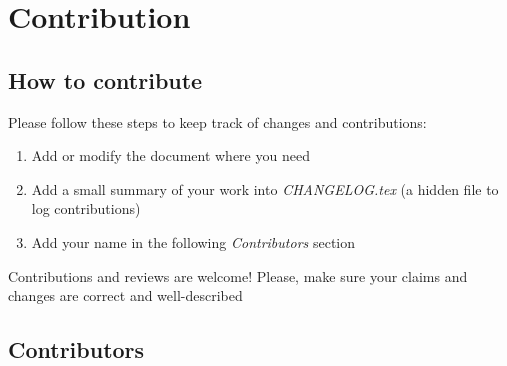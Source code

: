 \section*{Contribution}

\subsection*{How to contribute}
Please follow these steps to keep track of changes and contributions:
\begin{enumerate}
    \item Add or modify the document where you need
    \item Add a small summary of your work into \textit{CHANGELOG.tex} (a hidden file to log contributions)
    \item Add your name in the following \textit{Contributors} section
\end{enumerate}

Contributions and reviews are welcome! Please, make sure your claims and changes are correct and well-described

\subsection*{Contributors}
